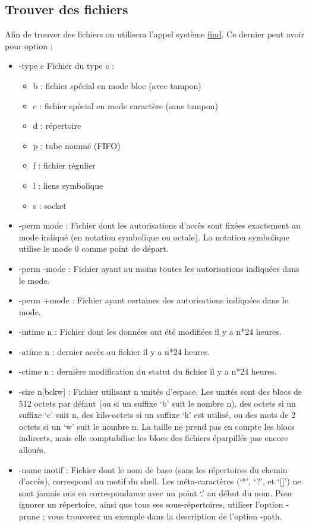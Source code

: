 \documentclass{article}[12pt]
\begin{document}
\subsection{ Trouver des fichiers}
Afin de trouver des fichiers on utilisera l'appel système \href{http://jp.barralis.com/linux-man/man1/find.1.php}{find}. Ce dernier peut avoir pour option :
\begin{itemize}
\item  -type c Fichier du type c :
\begin{itemize}
\item b : fichier spécial en mode bloc (avec tampon)
\item c : fichier spécial en mode caractère (sans tampon)
\item d : répertoire
\item p : tube nommé (FIFO)
\item f : fichier régulier
\item l : liens symbolique
\item s : socket
\end{itemize}
\item -perm mode : Fichier dont les autorisations d'accès sont fixées exactement au mode indiqué (en notation symbolique ou octale). La notation symbolique utilise le mode 0 comme point de départ.
\item -perm -mode : Fichier ayant au moins toutes les autorisations indiquées dans le mode.
\item -perm +mode : Fichier ayant certaines des autorisations indiquées dans le mode.
\item -mtime n : Fichier dont les données ont été modifiées il y a n*24 heures.
\item -atime n : dernier accès au fichier il y a n*24 heures.
\item -ctime n : dernière modification du statut du fichier il y a n*24 heures.
\item -size n[bckw] : Fichier utilisant n unités d'espace. Les unités sont des blocs de 512 octets par défaut (ou si un suffixe `b' suit le nombre n), des octets si un suffixe `c' suit n, des kilo-octets si un suffixe `k' est utilisé, ou des mots de 2 octets si un `w' suit le nombre n. La taille ne prend pas en compte les blocs indirects, mais elle comptabilise les blocs des fichiers éparpillés pas encore alloués.
\item -name motif : Fichier dont le nom de base (sans les répertoires du chemin d'accès), correspond au motif du shell. Les méta-caractères (`*', `?', et `[]') ne sont jamais mis en correspondance avec un point `.' au début du nom. Pour ignorer un répertoire, ainsi que tous ses sous-répertoires, utiliser l'option -prune ; vous trouverez un exemple dans la description de l'option -path.

\end{itemize}
\end{document}
